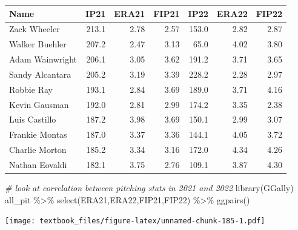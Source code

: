 \documentclass[
  11pt,
]{book}
\newenvironment{Shaded}{\begin{snugshade}}{\end{snugshade}}
\newcommand{\CommentTok}[1]{\textcolor[rgb]{0.56,0.35,0.01}{\textit{#1}}}
\newcommand{\FunctionTok}[1]{\textcolor[rgb]{0.00,0.00,0.00}{#1}}
\newcommand{\NormalTok}[1]{#1}
\newcommand{\SpecialCharTok}[1]{\textcolor[rgb]{0.00,0.00,0.00}{#1}}
\theoremstyle{definition}
\theoremstyle{definition}
\theoremstyle{definition}
\theoremstyle{definition}
\theoremstyle{remark}
\begin{document}
\begin{tabular}{lrrrrrr}
\toprule
Name & IP21 & ERA21 & FIP21 & IP22 & ERA22 & FIP22\\
\midrule
Zack Wheeler & 213.1 & 2.78 & 2.57 & 153.0 & 2.82 & 2.87\\
Walker Buehler & 207.2 & 2.47 & 3.13 & 65.0 & 4.02 & 3.80\\
Adam Wainwright & 206.1 & 3.05 & 3.62 & 191.2 & 3.71 & 3.65\\
Sandy Alcantara & 205.2 & 3.19 & 3.39 & 228.2 & 2.28 & 2.97\\
Robbie Ray & 193.1 & 2.84 & 3.69 & 189.0 & 3.71 & 4.16\\
\addlinespace
Kevin Gausman & 192.0 & 2.81 & 2.99 & 174.2 & 3.35 & 2.38\\
Luis Castillo & 187.2 & 3.98 & 3.69 & 150.1 & 2.99 & 3.07\\
Frankie Montas & 187.0 & 3.37 & 3.36 & 144.1 & 4.05 & 3.72\\
Charlie Morton & 185.2 & 3.34 & 3.16 & 172.0 & 4.34 & 4.26\\
Nathan Eovaldi & 182.1 & 3.75 & 2.76 & 109.1 & 3.87 & 4.30\\
\bottomrule
\end{tabular}

\newpage

\begin{Shaded}
\begin{Highlighting}[]
\CommentTok{\# look at correlation between pitching stats in 2021 and 2022}
\FunctionTok{library}\NormalTok{(GGally)}
\NormalTok{all\_pit }\SpecialCharTok{\%\textgreater{}\%} \FunctionTok{select}\NormalTok{(ERA21,ERA22,FIP21,FIP22) }\SpecialCharTok{\%\textgreater{}\%} \FunctionTok{ggpairs}\NormalTok{()}
\end{Highlighting}
\end{Shaded}

\texttt{[image: textbook\_files/figure-latex/unnamed-chunk-185-1.pdf]}

\newpage
\end{document}
